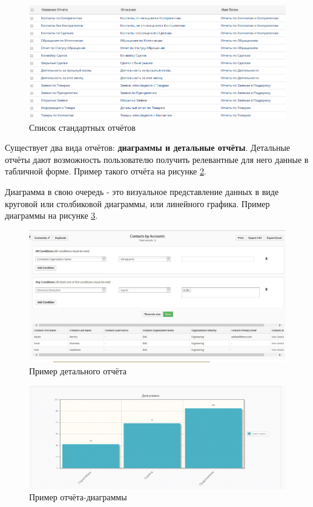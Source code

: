 \begin{figure}[htbp]
	\centering
	\includegraphics[width=1\textwidth]{fig/chapter_1/rep_1}
	\caption{Список стандартных отчётов}
	\label{fig:rep_1}
\end{figure}

Существует два вида отчётов: \textbf{диаграммы и детальные отчёты}. Детальные отчёты дают возможность пользователю получить релевантные для него данные в табличной форме. Пример такого отчёта на рисунке \ref{fig:rep_2}.

Диаграмма в свою очередь - это визуальное представление данных в виде круговой или столбиковой диаграммы, или линейного графика. Пример диаграммы на рисунке \ref{fig:diag}.

\begin{figure}[htbp]
	\centering
	\includegraphics[width=1\textwidth]{fig/chapter_1/rep_2}
	\caption{Пример детального отчёта}
	\label{fig:rep_2}
\end{figure}

\begin{figure}[htbp]
	\centering
	\includegraphics[width=.65\textwidth]{fig/chapter_1/diag}
	\caption{Пример отчёта-диаграммы}
	\label{fig:diag}
\end{figure}
\newpage

